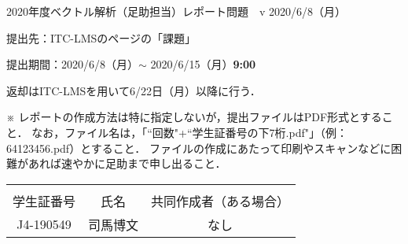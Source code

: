 \documentclass[dvipdfmx,nosetpagesize, uplatex]{jsarticle}
\newcommand\GAKUSEISHOBANGO{J4-190549}%
\newcommand\NAMAE{司馬博文}%
\newcommand\KYODOSAKUSEISHA{なし}%
\theoremstyle{definition}
\theoremstyle{StatementsWithStar}
\theoremstyle{StatementsWithStar2}
\theoremstyle{StatementsWithStar3}
\theoremstyle{StatementsWithCCirc}
\theoremstyle{definition}
\begin{document}
\thispagestyle{empty}
\setlength{\parindent}{1zw}
\setlength{\baselineskip}{14pt}
\setcounter{section}{6}
\setcounter{version}{2}
\noindent
2020年度ベクトル解析（足助担当）レポート問題~\thesection~v\theversion%
\hfil2020/6/8（月）\par\noindent
提出先：ITC-LMSのページの「課題」\par\noindent
提出期間：2020/6/8（月）$\sim$ 2020/6/15（月）\textbf{9:00}\par\noindent
返却はITC-LMSを用いて6/22日（月）以降に行う．\par\noindent
※ レポートの作成方法は特に指定しないが，提出ファイルはPDF形式とすること．
なお，ファイル名は，「``回数"+``学生証番号の下7桁.pdf\/"」（例：64123456.pdf）とすること．
ファイルの作成にあたって印刷やスキャンなどに困難があれば速やかに足助まで申し出ること．
\vskip-18pt\noindent
\begin{table}[h]
\begin{tabular}{|c|c|c|} \hline
& & \\[-13pt]
学生証番号& 氏名 & 共同作成者（ある場合）\\[2pt] \hline
\rule{0pt}{16pt}%
\parbox[c]{9.2zw}{\GAKUSEISHOBANGO\hfill} & \parbox[c]{13.0zw}{\NAMAE\hfill} & \parbox[c]{25.6zw}{\KYODOSAKUSEISHA\hfill}\\[6pt] \hline
\end{tabular}
\end{table}
\end{document}
